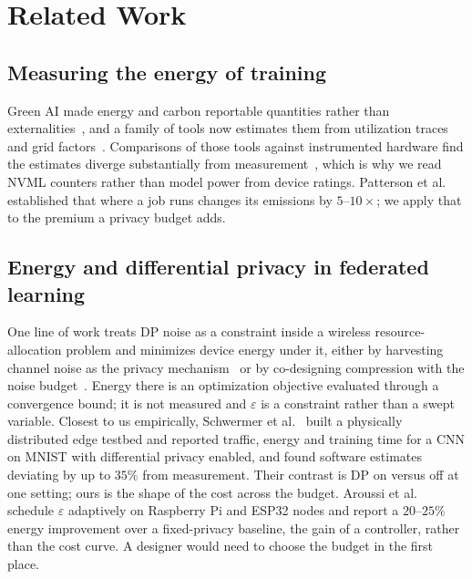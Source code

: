 
\section{Related Work}

\subsection{Measuring the energy of training}

Green AI made energy and carbon reportable quantities rather than
externalities~\cite{schwartz2020green, strubell2019energy}, and a family of tools now estimates
them from utilization traces and grid factors~\cite{henderson2020towards, anthony2020carbontracker,
lacoste2019quantifying}. Comparisons of those tools against instrumented hardware find the
estimates diverge substantially from measurement~\cite{bouza2023estimate,
aquino2025towards}, which is why we read NVML counters rather than model power
from device ratings. Patterson et al.~\cite{patterson2021carbon} established that
where a job runs changes its emissions by $5$--$10\times$; we apply that to
the premium a privacy budget adds.

\subsection{Energy and differential privacy in federated learning}

One line of work treats DP noise as a constraint inside a wireless
resource-allocation problem and minimizes device energy under it, either by
harvesting channel noise as the privacy mechanism~\cite{liu2020privacy, zhang2023communication, mao2026providing} or by co-designing compression with the noise budget~\cite{chen2023energy, ding2026energy}. 
Energy there is an optimization objective evaluated
through a convergence bound; it is not measured and $\varepsilon$ is a
constraint rather than a swept variable. Closest to us empirically,
Schwermer et al.~\cite{schwermer2023energy} built a physically distributed edge testbed
and reported traffic, energy and training time for a CNN on MNIST with
differential privacy enabled, and found software estimates deviating by up to
$35\%$ from measurement. Their contrast is DP on versus off at one setting;
ours is the shape of the cost across the budget. Aroussi
et al.~\cite{aroussi2026adaptive} schedule $\varepsilon$ adaptively on Raspberry Pi and
ESP32 nodes and report a $20$--$25\%$ energy improvement over a fixed-privacy
baseline, the gain of a controller, rather than the cost curve. A designer
would need to choose the budget in the first place.

